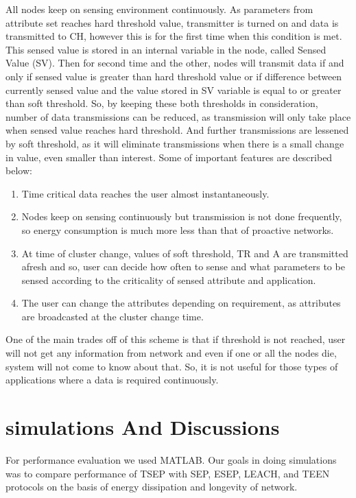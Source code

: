 \documentclass[conference]{IEEEtran}
\begin{document}
All nodes keep on sensing environment continuously. As parameters from attribute set reaches hard threshold value, transmitter is turned on and data is transmitted to CH, however this is for the first time when this condition is met. This sensed value is stored in an internal variable in the node, called Sensed Value (SV). Then for second time and the other, nodes will transmit data if and only if sensed value is greater than hard threshold value or if difference between currently sensed value and the value stored in SV variable is equal to or greater than soft threshold. So, by keeping these both thresholds in consideration, number of data transmissions can be reduced, as transmission will only take place when sensed value reaches hard threshold. And further transmissions are lessened by soft threshold, as it will eliminate transmissions when there is a small change in value, even smaller than interest. Some of important features are described below:\\
\begin{enumerate}
  \item Time critical data reaches the user almost instantaneously.
  \item Nodes keep on sensing continuously but transmission is not done frequently, so energy consumption is much more less than that of proactive networks.
  \item At time of cluster change, values of soft threshold, TR and A are transmitted afresh and so, user can decide how often to sense and what parameters to be sensed according to the criticality of sensed attribute and application.
  \item The user can change the attributes depending on requirement, as attributes are broadcasted at the cluster change time.
\end{enumerate}
	
One of the main trades off of this scheme is that if threshold is not reached, user will not get any information from network and even if one or all the nodes die, system will not come to know about that. So, it is not useful for those types of applications where a data is required continuously.\\

\section{simulations And Discussions}
 For performance evaluation we used MATLAB. Our goals in doing simulations was to compare performance of TSEP with SEP, ESEP, LEACH, and TEEN protocols on the basis of energy dissipation and longevity of network.
\end{document}
